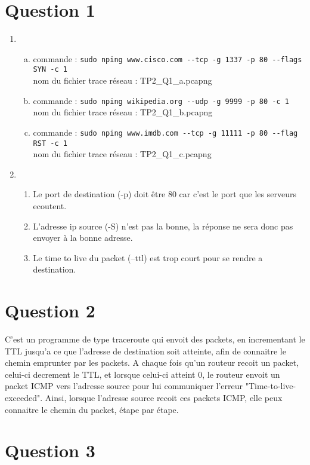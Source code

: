 
\section{Question 1}
\begin{enumerate}
	\item 
	\begin{enumerate}[a)]
		\item 
			commande : \verb!sudo nping www.cisco.com --tcp -g 1337 -p 80 --flags SYN -c 1!\\
			nom du fichier trace réseau : TP2\_Q1\_a.pcapng
		\item 
			commande : \verb!sudo nping wikipedia.org --udp -g 9999 -p 80 -c 1!\\
			nom du fichier trace réseau : TP2\_Q1\_b.pcapng
		\item 
			commande : \verb!sudo nping www.imdb.com --tcp -g 11111 -p 80 --flag RST -c 1!\\
			nom du fichier trace réseau : TP2\_Q1\_c.pcapng
	\end{enumerate}
	\item 
		\begin{enumerate}
			\item
				Le port de destination (-p) doit être 80 
				car c'est le port que les serveurs ecoutent.
			\item
				L'adresse ip source (-S) n'est pas la bonne,
				la réponse ne sera donc pas envoyer à la bonne
				adresse.
			\item
				Le time to live du packet (--ttl) est trop court
				pour se rendre a destination.
		\end{enumerate}
\end{enumerate}

\section{Question 2}
C'est un programme de type traceroute qui envoit des packets, 
en incrementant le TTL jusqu'a ce que l'adresse de destination soit 
atteinte, afin de connaitre le chemin emprunter par les packets. 
A chaque fois qu'un routeur recoit un packet, 
celui-ci decrement le TTL, et lorsque celui-ci atteint 0,
le routeur envoit un packet ICMP vers l'adresse source pour lui
communiquer l'erreur "Time-to-live-exceeded". Ainsi, lorsque 
l'adresse source recoit ces packets ICMP, 
elle peux connaitre le chemin du packet, étape par étape.

\section{Question 3}

